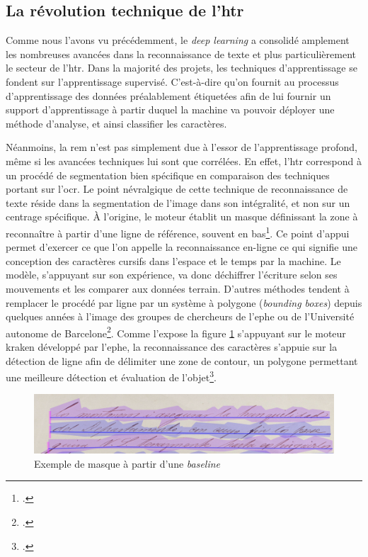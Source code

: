	\subsection{La révolution technique de l'\gls{htr}}
	
	Comme nous l'avons vu précédemment, le \textit{deep learning} a consolidé amplement les nombreuses avancées dans la reconnaissance de texte et plus particulièrement le secteur de l'\gls{htr}. Dans la majorité des projets, les techniques d'apprentissage se fondent sur l'apprentissage supervisé. C'est-à-dire qu'on fournit au processus d'apprentissage des données préalablement étiquetées afin de lui fournir un support d'apprentissage à partir duquel la machine va pouvoir déployer une méthode d'analyse, et ainsi classifier les caractères.
	
	Néanmoins, la \gls{rem} n'est pas simplement due à l'essor de l'apprentissage profond, même si les avancées techniques lui sont que corrélées. En effet, l'\gls{htr} correspond à un procédé de segmentation bien spécifique en comparaison des techniques portant sur l'\gls{ocr}. Le point névralgique de cette technique de reconnaissance de texte réside dans la segmentation de l'image dans son intégralité, et non sur un centrage spécifique. À l’origine, le moteur établit un masque définissant la zone à reconnaître à partir d'une ligne de référence, souvent en bas\footcite[p.~25-26]{noemieOCRHTRGraphie2022}. Ce point d'appui permet d'exercer ce que l'on appelle la reconnaissance en-ligne ce qui signifie une conception des caractères cursifs dans l'espace et le temps par la machine. Le modèle, s'appuyant sur son expérience, va donc déchiffrer l'écriture selon ses mouvements et les comparer aux données terrain. D'autres méthodes tendent à remplacer le procédé par ligne par un système à polygone (\textit{bounding boxes}) depuis quelques années à l'image des groupes de chercheurs de l'\gls{ephe} ou de l'Université autonome de Barcelone\footcite{carbonellNeuralModelText2020, kiesslingBADAMPublicDataset2019}. Comme l'expose la figure \ref{fig:mask_baseline} s'appuyant sur le moteur kraken développé par l'\gls{ephe}, la reconnaissance des caractères s'appuie sur la détection de ligne afin de délimiter une zone de contour, un polygone permettant une meilleure détection et évaluation de l'objet\footcite[p.~26]{noemieOCRHTRGraphie2022}.
	
	\begin{figure}[h!]
	    \centering
	    \includegraphics[width=1\textwidth]{annexes/img/mask_baseline.png}
	    \caption{Exemple de masque à partir d'une \textit{baseline}}
	    \label{fig:mask_baseline}
	\end{figure}
	
